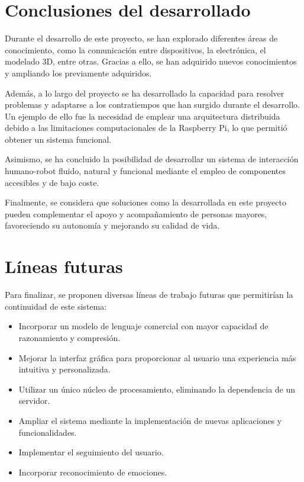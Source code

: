 \section{Conclusiones del desarrollado}

Durante el desarrollo de este proyecto, se han explorado diferentes áreas de conocimiento, como la comunicación entre dispositivos, la electrónica, el modelado 3D, entre otras. Gracias a ello, se han adquirido nuevos conocimientos y ampliando los previamente adquiridos.
\vspace{0.2cm}

Además, a lo largo del proyecto se ha desarrollado la capacidad para resolver problemas y adaptarse a los contratiempos que han surgido durante el desarrollo. Un ejemplo de ello fue la necesidad de emplear una arquitectura distribuida debido a las limitaciones computacionales de la Raspberry Pi, lo que permitió obtener un sistema funcional.

\vspace{0.2cm}

Asimismo, se ha concluido la posibilidad de desarrollar un sistema de interacción humano-robot fluido, natural y funcional mediante el empleo de componentes accesibles y de bajo coste.


\vspace{0.2cm}

Finalmente, se considera que soluciones como la desarrollada en este proyecto pueden complementar el apoyo y acompañamiento de personas mayores, favoreciendo su autonomía y mejorando su calidad de vida.


\section{Líneas futuras}

Para finalizar, se proponen diversas líneas de trabajo futuras que permitirían la continuidad de este sistema:

\begin{itemize}
	\item Incorporar un modelo de lenguaje comercial con mayor capacidad de razonamiento y compresión.
	\item Mejorar la interfaz gráfica para proporcionar al usuario una experiencia más intuitiva y personalizada.
	\item Utilizar un único núcleo de procesamiento, eliminando la dependencia de un servidor.
    \item Ampliar el sistema mediante la implementación de nuevas aplicaciones y funcionalidades.
    \item Implementar el seguimiento del usuario.
    \item Incorporar reconocimiento de emociones.
\end{itemize}

